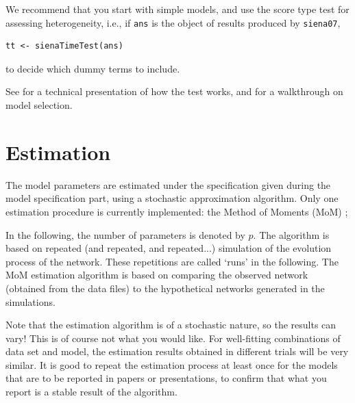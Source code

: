\documentclass[a4paper,fleqn]{article}
\newcommand{\+}{\, + \,}
\begin{document}
{We recommend that you start with simple models, and use the score type test for
assessing heterogeneity, i.e., if \texttt{ans} is the object of results produced
by \texttt{siena07},
\begin{verbatim}
tt <- sienaTimeTest(ans)
\end{verbatim}
to decide which dummy terms to include.

See \citet{Lospinoso2010a} for a technical presentation of how the test works,
and \citet{Lospinoso2010b} for a walkthrough on model selection.


\begin{print}
\newpage
\end{print}

\section{Estimation}
\label{S_Est}

The model parameters are estimated under the specification given
during the model specification part, using a stochastic
approximation algorithm.
Only one estimation procedure is currently implemented:
the Method of Moments (MoM) \citep*{Snijders01, SnijdersEA07};


In the following, the number of
parameters is denoted by $p$. The algorithm %
is based on repeated
(and repeated, and repeated...) simulation of the evolution
process of the network. These repetitions are called `runs' in the
following. The MoM estimation algorithm is based on comparing the
observed network (obtained from the data files)
to the hypothetical networks generated in the simulations.

Note that the estimation algorithm is of a stochastic nature, so
the results can vary! This is of course not what you would like.
For well-fitting combinations of data set and model, the
estimation results obtained in different trials will be very
similar. It is good to repeat the estimation process at least once
for the models that are to be reported in papers or presentations,
to confirm that what you report is a stable result of the
algorithm.

}
\end{document}
